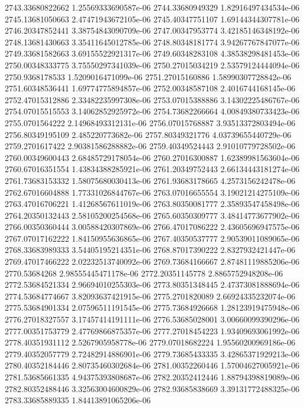 {2743.33680822662 1.25569333690587e-06
2744.33680949329 1.82916497434534e-06
2745.13681050663 2.47471943672105e-06
2745.40347751107 1.69144344307781e-06
2746.20347852441 3.38754843090709e-06
2747.00347953774 3.42185146348192e-06
2748.13681430663 3.35411645012785e-06
2748.80348181774 3.94267767847077e-06
2749.33681582663 3.69155522921317e-06
2749.60348283108 4.38538298481453e-06
2750.00348333775 3.75550297341039e-06
2750.27015034219 2.53579124444094e-06
2750.9368178533 1.5209016471099e-06
2751.27015160886 1.58990307728842e-06
2751.60348536441 1.69774775894857e-06
2752.00348587108 2.4016744168145e-06
2752.47015312886 2.33482235997308e-06
2753.07015388886 3.14302225486767e-06
2754.07015515553 3.14062852925972e-06
2754.73682266664 4.00849380733423e-06
2755.0701564222 2.14968493312131e-06
2756.07015768887 3.93513372803494e-06
2756.80349195109 2.485220773682e-06
2757.80349321776 4.03739655440729e-06
2759.2701617422 2.90381586288882e-06
2759.40349524443 2.91010779728502e-06
2760.00349600443 2.68485729178054e-06
2760.27016300887 1.62389981563604e-06
2760.67016351554 1.43834388285921e-06
2761.20349752443 2.66134443181274e-06
2761.73683153332 1.58075680030413e-06
2761.93683178665 4.2573156242478e-06
2762.67016604888 1.77331026844767e-06
2763.07016655554 3.19021214275109e-06
2763.47016706221 1.41268567611019e-06
2763.80350081777 2.35893547458498e-06
2764.20350132443 2.58105200254568e-06
2765.60350309777 3.48414773677902e-06
2766.00350360444 3.00588420307869e-06
2766.47017086222 2.43605696947575e-06
2767.07017162222 1.84150955636865e-06
2767.40350537777 2.90539011089065e-06
2768.33683989333 3.54405195214351e-06
2768.87017390222 2.8327932421447e-06
2769.47017466222 2.02232513740092e-06
2769.73684166667 2.87481119885206e-06
2770.53684268 2.98555445471178e-06
2772.20351145778 2.8865752948208e-06
2772.53684521334 2.96694010255303e-06
2773.80351348445 2.47373081888694e-06
2774.53684774667 3.82093637421915e-06
2775.2701820089 2.66924335232074e-06
2775.53684901334 2.07596511191545e-06
2775.73684926668 1.28123919475948e-06
2776.27018327557 3.17457414191111e-06
2776.53685028001 3.00660099390296e-06
2777.00351753779 2.47769866875357e-06
2777.27018454223 1.93409693061992e-06
2778.40351931112 2.5267905958778e-06
2779.07018682224 1.95560200969186e-06
2779.40352057779 2.72482914886901e-06
2779.73685433335 3.42865371929213e-06
2780.40352184446 2.80735460302684e-06
2781.00352260446 1.57004627005921e-06
2781.53685661335 4.94375393808687e-06
2782.20352412446 1.88794398819089e-06
2782.80352488446 3.32563004600829e-06
2782.93685838669 3.39131772488325e-06
2783.33685889335 1.84413891065206e-06
}
